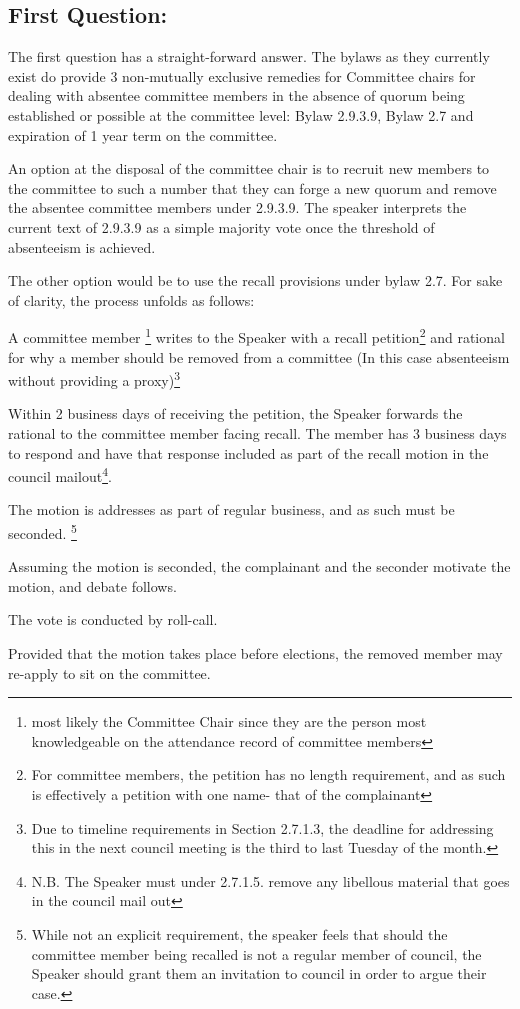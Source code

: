 	\begin{multicols}{2}
\subsection*{First Question:}
The first question has a straight-forward answer.  The bylaws as they currently exist do provide 3 non-mutually exclusive remedies for Committee chairs for dealing with absentee committee members in the absence of quorum being established or possible at the committee level: Bylaw 2.9.3.9, Bylaw 2.7 and expiration of 1 year term on the committee.  

An option at the disposal of the committee chair is to recruit new members to the committee to such a number that they can forge a new quorum and remove the absentee committee members under 2.9.3.9.  The speaker interprets the current text of 2.9.3.9 as a simple majority vote once the threshold of absenteeism is achieved.    

The other option would be to use the recall provisions under bylaw 2.7. For sake of clarity, the process unfolds as follows:  
\begin{longenum}[ label*=\arabic*., align=left]

\item A committee member \footnote{most likely the Committee Chair since they are the person most knowledgeable on the attendance record of committee members} writes to the Speaker with a recall petition\footnote{For committee members, the petition has no length requirement, and as such is effectively a petition with one name- that of the complainant} and rational for why a member should be removed from a committee (In this case absenteeism without providing a proxy)\footnote{Due to timeline requirements in Section 2.7.1.3, the deadline for addressing this in the next council meeting is the third to last Tuesday of the month.}
\item Within 2 business days of receiving the petition, the Speaker forwards the rational to the committee member facing recall. The member has 3 business days to respond and have that response included as part of the recall motion in the council mailout\footnote{N.B. The Speaker must under 2.7.1.5. remove any libellous material that goes in the council mail out}.  
\item The motion is addresses as part of regular business, and as such must be seconded. \footnote{While not an explicit requirement, the speaker feels that should the committee member being recalled is not a regular member of council, the Speaker should grant them an invitation to council in order to argue their case.}  
\item Assuming the motion is seconded, the complainant and the seconder motivate the motion, and debate follows.
\item The vote is conducted by roll-call.
\item Provided that the motion takes place before elections, the removed member may re-apply to sit on the committee.  
\end{longenum}  


\end{multicols}
